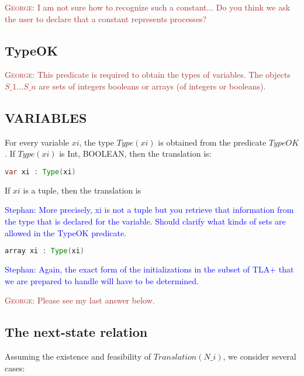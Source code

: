 \documentclass{article}
\theoremstyle{plain}
\numberwithin{equation}{section}
\newcommand{\george}[1]{\textcolor{brown}{\textsc{George: } {\sf #1}}}
\newcommand{\ste}[1]{\par\noindent\textcolor{blue}{\small Stephan: #1}}
\begin{document}
\george{I am not sure how to recognize such a constant... Do you think we ask the user to declare that a constant represents processes?  }


\subsection*{TypeOK} \george{This predicate is required to obtain the types of variables. The objects $S\_1 \dots S\_n$ are sets of integers booleans or arrays (of integers or booleans).  } 




\subsection*{VARIABLES} For every variable $xi$, the type  \emph{$Type(xi)$} is obtained from the predicate \emph{$TypeOK$}. If \emph{$Type(xi)$} is Int, BOOLEAN, then the translation is: 

\begin{lstlisting}[language=Java]
var xi : Type(xi) 
\end{lstlisting}

If $xi$ is a tuple, then the translation is 

\ste{More precisely, xi is not a tuple but you retrieve that information from
  the type that is declared for the variable. Should clarify what kinds of sets
  are allowed in the TypeOK predicate.}

\begin{lstlisting}[language=Java]
array xi : Type(xi) 
\end{lstlisting}


\ste{Again, the exact form of the initializations in the subset of TLA+ that we
  are prepared to handle will have to be determined.}

\george{Please see my last answer below.}

\subsection*{The next-state relation} 
Assuming the existence and feasibility of \emph{$Translation(N\_i)$}, we consider several cases:
\end{document}
